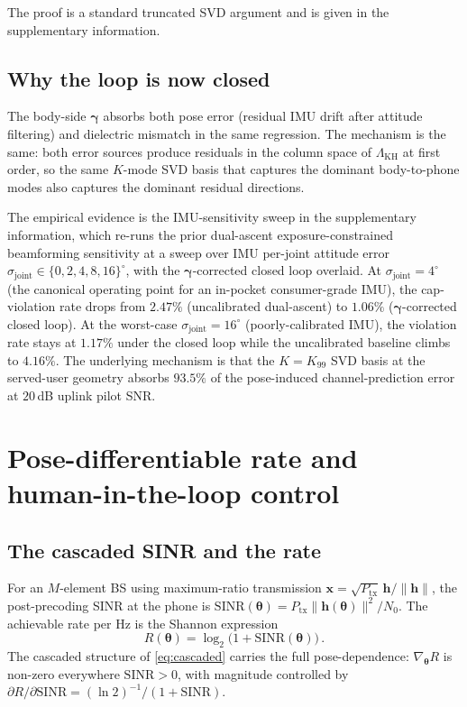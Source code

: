 \documentclass[journal,twocolumn,10pt]{IEEEtran}
\theoremstyle{plain}
\theoremstyle{definition}
\theoremstyle{remark}
\newcommand{\xx}{\mathbf{x}}
\newcommand{\hh}{\mathbf{h}}
\newcommand{\thetab}{\bm{\theta}}
\newcommand{\gammab}{\bm{\gamma}}
\begin{document}
The proof is a standard truncated SVD argument and is given in
the supplementary information.

\subsection{Why the loop is now closed}

The body-side $\gammab$ absorbs both pose error (residual IMU drift
after attitude filtering) and dielectric mismatch in the same
regression. The mechanism is the same: both error sources produce
residuals in the column space of $\Lambda_{\mathrm{KH}}$ at first
order, so the same $K$-mode SVD basis that captures the dominant
body-to-phone modes also captures the dominant residual directions.

The empirical evidence is the IMU-sensitivity sweep in
the supplementary information, which re-runs the prior dual-ascent
exposure-constrained beamforming sensitivity at a sweep over IMU
per-joint attitude error $\sigma_{\mathrm{joint}} \in \{0, 2, 4, 8,
16\}^{\circ}$, with the $\gammab$-corrected closed loop overlaid.
At $\sigma_{\mathrm{joint}} = 4^{\circ}$ (the canonical operating
point for an in-pocket consumer-grade IMU), the cap-violation rate
drops from $2.47\%$ (uncalibrated dual-ascent) to $1.06\%$
($\gammab$-corrected closed loop). At the worst-case
$\sigma_{\mathrm{joint}} = 16^{\circ}$ (poorly-calibrated IMU), the
violation rate stays at $1.17\%$ under the closed loop while the
uncalibrated baseline climbs to $4.16\%$. The underlying mechanism
is that the $K = K_{99}$ SVD basis at the served-user geometry
absorbs $93.5\%$ of the pose-induced channel-prediction error at
$20\,$dB uplink pilot SNR.


\section{Pose-differentiable rate and human-in-the-loop control}\label{sec:control}

\subsection{The cascaded SINR and the rate}

For an $M$-element BS using maximum-ratio transmission $\xx =
\sqrt{P_{\mathrm{tx}}}\,\hh / \|\hh\|$, the post-precoding SINR at
the phone is $\mathrm{SINR}(\thetab) = P_{\mathrm{tx}} \|\hh(\thetab)\|^{2}
/ N_0$. The achievable rate per Hz is the Shannon expression
\begin{equation}\label{eq:rate}
R(\thetab) = \log_2\bigl(1 + \mathrm{SINR}(\thetab)\bigr)\,.
\end{equation}
The cascaded structure of \cref{eq:cascaded} carries the full
pose-dependence: $\nabla_{\thetab} R$ is non-zero everywhere
$\mathrm{SINR}>0$, with magnitude controlled by
$\partial R / \partial \mathrm{SINR} = (\ln 2)^{-1}/(1 + \mathrm{SINR})$.
\end{document}
